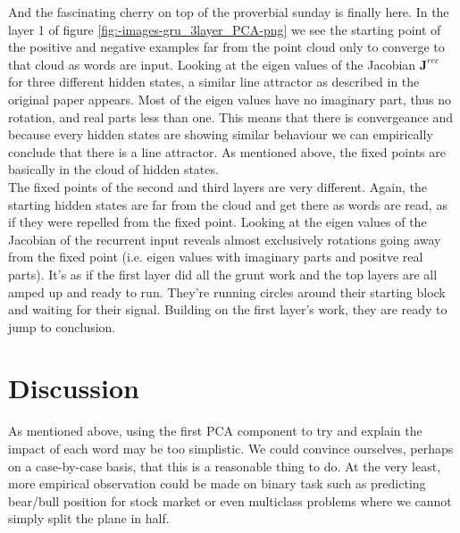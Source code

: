 \documentclass{article}
\begin{document}
And the fascinating cherry on top of the proverbial sunday is finally here. In the layer 1 of figure \ref{fig:-images-gru_3layer_PCA-png} we see the starting point of the positive and negative examples far from the point cloud only to converge to that cloud as words are input. Looking at the eigen values of the Jacobian $\textbf{J}^{rec}$ for three different hidden states, a similar line attractor as described in the original paper appears. Most of the eigen values have no imaginary part, thus no rotation, and real parts less than one. This means that there is convergeance and because every hidden states are showing similar behaviour we can empirically conclude that there is a line attractor. As mentioned above, the fixed points are basically in the cloud of hidden states.\\
The fixed points of the second and third layers are very different. Again, the starting hidden states are far from the cloud and get there as words are read, as if they were repelled from the fixed point. Looking at the eigen values of the Jacobian of the recurrent input reveals almost exclusively rotations going away from the fixed point (i.e. eigen values with imaginary parts and positve real parts). It's as if the first layer did all the grunt work and the top layers are all amped up and ready to run. They're running circles around their starting block and waiting for their signal. Building on the first layer's work, they are ready to jump to conclusion.

\section{Discussion}

As mentioned above, using the first PCA component to try and explain the impact of each word may be too simplistic. We could convince ourselves, perhaps on a case-by-case basis, that this is a reasonable thing to do. At the very least, more empirical observation could be made on binary task such as predicting bear/bull position for stock market or even multiclass problems where we cannot simply split the plane in half.

\end{document}
